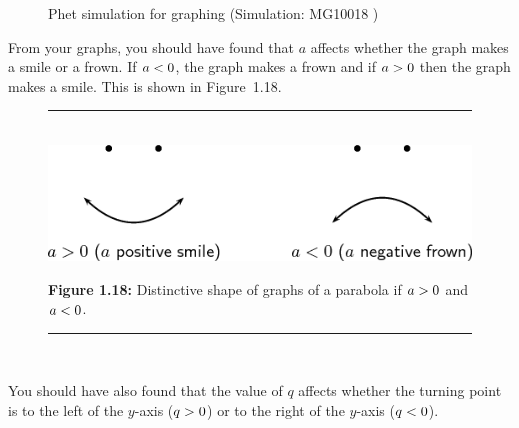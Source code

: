     \setcounter{subfigure}{0}
	\begin{figure}[H] %
    \textnormal{Phet simulation for graphing}\vspace{.1in} \nopagebreak
  \label{m39345*phet!!!underscore!!!sim}\label{m39345*phet-simulation}
             { (Simulation:  MG10018 )}
      \vspace{2pt}
    \vspace{.1in}
 \end{figure}       \par \label{m39345*id241684}From your graphs, you should have found that $a$ affects whether the graph makes a smile or a frown. If $a<{}0$, the graph makes a frown and if $a>{}0$ then the graph makes a smile. This is shown in Figure~1.18.\par 
    \setcounter{subfigure}{0}
	\begin{figure}[H] %
    \begin{center}
    \rule[.1in]{\figurerulewidth}{.005in} \\
        \label{m39345*uid115!!!underscore!!!media}\label{m39345*uid115!!!underscore!!!printimage}\includegraphics{col11306.imgs/m39345_MG10C11_014.png} %
      \vspace{2pt}
    \vspace{\rubberspace}\par \begin{cnxcaption}
	  \small \textbf{Figure 1.18: }Distinctive shape of graphs of a parabola if $a>{}0$ and $a<{}0$.
	\end{cnxcaption}
    \vspace{.1in}
    \rule[.1in]{\figurerulewidth}{.005in} \\
    \end{center}
 \end{figure}       
        \label{m39345*id241776}You should have also found that the value of $q$ affects whether the turning point is to the left of the $y$-axis ($q>{}0$) or to the right of the $y$-axis ($q<{}0$).\par 
